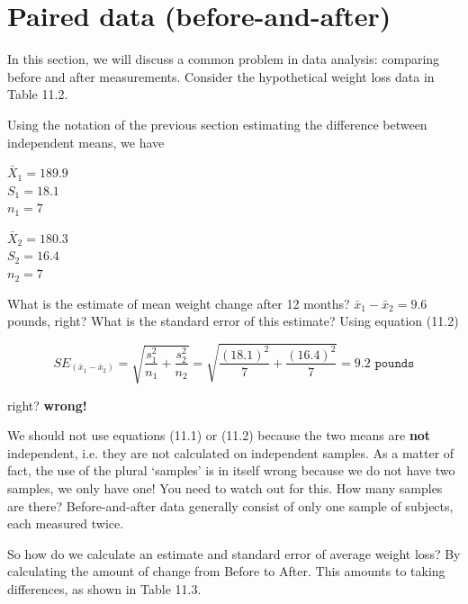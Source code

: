 \documentclass[11pt, chapterprefix=true]{scrbook}\usepackage[]{graphicx}\usepackage[]{color}
\begin{document}
\section{Paired data (before-and-after)}

In this section, we will discuss a common problem in data analysis: comparing before and after measurements.  Consider the hypothetical weight loss data in Table 11.2.

Using the notation of the previous section estimating the difference between independent means, we have

\begin{center}
\begin{minipage}[ht]{3cm}

$\bar{X}_1 = 189.9$ \\
$S_1 = 18.1$ \\
$n_1 = 7$ 
\end{minipage}
\begin{minipage}[ht]{3cm}

$\bar{X}_2 = 180.3$ \\
$S_2 = 16.4$ \\
$n_2 = 7$ 
\end{minipage}
\end{center}

What is the estimate of mean weight change after 12 months?  $\bar{x}_1 - \bar{x}_2 = 9.6$ pounds, right?  What is the standard error of this estimate? Using equation (11.2) 

\begin{equation*}
SE_{(\bar{x}_1 - \bar{x}_2)} = \sqrt{\frac{s_1^2}{n_1}  + \frac{s_2^2}{n_2} } = \sqrt{\frac{(18.1)^2}{7}  + \frac{(16.4)^2}{7} } = 9.2 \texttt{ pounds}
\end{equation*}

right?  \textbf{wrong!}

We should not use equations (11.1) or (11.2) because the two means are \textbf{not} independent, i.e. they are not calculated on independent samples.  As a matter of fact, the use of the plural `samples' is in itself wrong because we do not have two samples, we only have one! You need to watch out for this.  How many samples are there?  Before-and-after data generally consist of only one sample of subjects, each measured twice.

So how do we calculate an estimate and standard error of average weight loss?  
By calculating the amount of change from Before to After.  This amounts to taking 
differences, as shown in Table 11.3.
\end{document}

